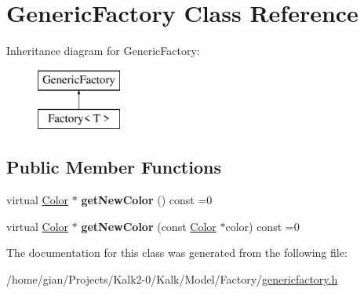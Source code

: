 \hypertarget{class_generic_factory}{}\section{Generic\+Factory Class Reference}
\label{class_generic_factory}
Inheritance diagram for Generic\+Factory\+:\begin{figure}[H]
\begin{center}
\leavevmode
\includegraphics[height=2.000000cm]{class_generic_factory}
\end{center}
\end{figure}
\subsection*{Public Member Functions}
\begin{DoxyCompactItemize}
\item 
\mbox{\label{class_generic_factory_a1e4a2993cb1684a24ed3edfb06efdaed}} 
virtual \hyperlink{class_color}{Color} $\ast$ {\bfseries get\+New\+Color} () const =0
\item 
\mbox{\label{class_generic_factory_a478ac68c07e43943450d76babc963bab}} 
virtual \hyperlink{class_color}{Color} $\ast$ {\bfseries get\+New\+Color} (const \hyperlink{class_color}{Color} $\ast$color) const =0
\end{DoxyCompactItemize}


The documentation for this class was generated from the following file\+:\begin{DoxyCompactItemize}
\item 
/home/gian/\+Projects/\+Kalk2-\/0/\+Kalk/\+Model/\+Factory/\hyperlink{genericfactory_8h}{genericfactory.\+h}\end{DoxyCompactItemize}
